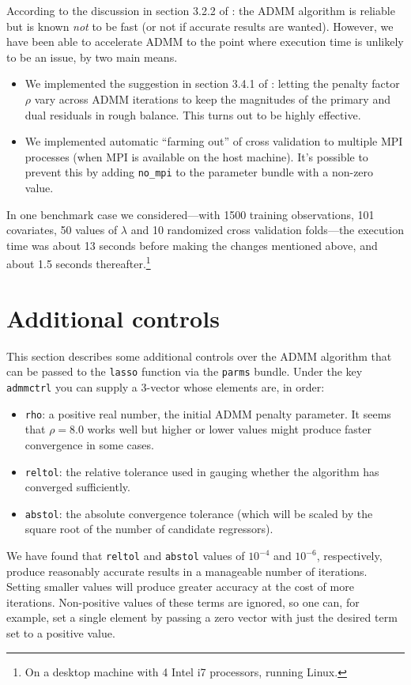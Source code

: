 \documentclass{article}
\begin{document}
According to the discussion in section 3.2.2 of \cite{boyd2010}: the
ADMM algorithm is reliable but is known \textit{not} to be fast (or
not if accurate results are wanted). However, we have been able to
accelerate ADMM to the point where execution time is unlikely to be an
issue, by two main means.
\begin{itemize}
\item We implemented the suggestion in section 3.4.1 of
  \cite{boyd2010}: letting the penalty factor $\rho$ vary across ADMM
  iterations to keep the magnitudes of the primary and dual residuals
  in rough balance. This turns out to be highly effective.
\item We implemented automatic ``farming out'' of cross validation to
  multiple \textsf{MPI} processes (when \textsf{MPI} is available on
  the host machine). It's possible to prevent this by adding
  \texttt{no\_mpi} to the parameter bundle with a non-zero value.
\end{itemize}
In one benchmark case we considered---with 1500 training observations,
101 covariates, 50 values of $\lambda$ and 10 randomized cross
validation folds---the execution time was about 13 seconds before
making the changes mentioned above, and about 1.5 seconds
thereafter.\footnote{On a desktop machine with 4 Intel i7 processors,
  running Linux.}

\section{Additional controls}
\label{sec:add-controls}

This section describes some additional controls over the ADMM
algorithm that can be passed to the \texttt{lasso} function via the
\texttt{parms} bundle. Under the key \texttt{admmctrl} you can supply
a 3-vector whose elements are, in order:
\begin{itemize}
\item \texttt{rho}: a positive real number, the initial ADMM penalty
  parameter. It seems that $\rho = 8.0$ works well but higher or lower
  values might produce faster convergence in some cases.
\item \texttt{reltol}: the relative tolerance used in gauging whether
  the algorithm has converged sufficiently.
\item \texttt{abstol}: the absolute convergence tolerance (which will
  be scaled by the square root of the number of candidate regressors).
\end{itemize}
We have found that \texttt{reltol} and \texttt{abstol} values of
$10^{-4}$ and $10^{-6}$, respectively, produce reasonably accurate
results in a manageable number of iterations. Setting smaller values
will produce greater accuracy at the cost of more iterations.
Non-positive values of these terms are ignored, so one can, for
example, set a single element by passing a zero vector with just the
desired term set to a positive value.
\end{document}
